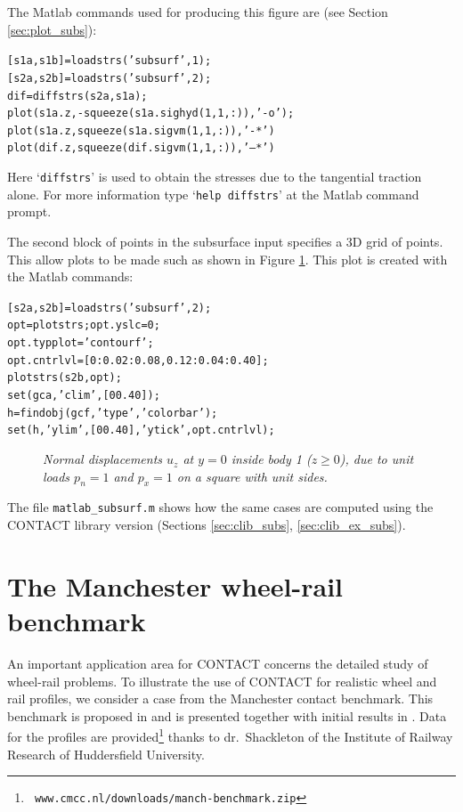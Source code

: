\documentclass[12pt]{report}
\begin{document}
The Matlab commands used for producing this figure are (see Section
\ref{sec:plot_subs}):
\begin{alltt}\small
  [s1a, s1b] = loadstrs('subsurf', 1);
  [s2a, s2b] = loadstrs('subsurf', 2);
  dif = diffstrs(s2a, s1a);
  plot(s1a.z, -squeeze(s1a.sighyd(1,1,:)), '-o');
  plot(s1a.z,  squeeze(s1a.sigvm(1,1,:)), '-*')
  plot(dif.z,  squeeze(dif.sigvm(1,1,:)), '--*')
\end{alltt}
Here `{\tt diffstrs}' is used to obtain the stresses due to the tangential
traction alone. For more information type `{\tt help diffstrs}' at the
Matlab command prompt.

The second block of points in the subsurface input specifies a 3D grid of
points. This allow plots to be made such as shown in Figure
\ref{fig:subsurf2}. This plot is created with the Matlab commands:
\begin{alltt}\small
  [s2a, s2b] = loadstrs('subsurf', 2);
  opt = plotstrs; opt.yslc = 0;
  opt.typplot = 'contourf';
  opt.cntrlvl = [0:0.02:0.08, 0.12:0.04:0.40];
  plotstrs(s2b, opt);
  set(gca,'clim',[0 0.40]);
  h=findobj(gcf,'type','colorbar');
  set(h, 'ylim',[0 0.40], 'ytick',opt.cntrlvl);
\end{alltt}

\begin{figure}[bt]
\centering
{}
\caption{\em Normal displacements $u_z$ at $y=0$ inside body 1 ($z\ge 0$),
due to unit loads $p_n=1$ and $p_x=1$ on a square with unit sides.}
\label{fig:subsurf2}
\end{figure}

The file {\tt matlab\_subsurf.m} shows how the same cases are computed
using the CONTACT library version (Sections \ref{sec:clib_subs},
\ref{sec:clib_ex_subs}).

\section{The Manchester wheel-rail benchmark}
\label{sec:ex_mbench}

An important application area for CONTACT concerns the detailed study of
wheel-rail problems. To illustrate the use of CONTACT for
realistic wheel and rail profiles, we consider a case from the Manchester
contact benchmark. This benchmark is proposed in \cite{Shackleton2006} and is
presented together with initial results in \cite{Shackleton2008}. Data for
the profiles are provided\footnote{\tt
www.cmcc.nl/downloads/manch-benchmark.zip} thanks to dr.\ Shackleton of
the Institute of Railway Research of Huddersfield University.
\end{document}
